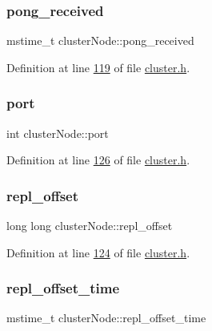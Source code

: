 \subsubsection{\texorpdfstring{pong\+\_\+received}{pong\_received}}
{\footnotesize\ttfamily mstime\+\_\+t cluster\+Node\+::pong\+\_\+received}



Definition at line \hyperlink{cluster_8h_source_l00119}{119} of file \hyperlink{cluster_8h_source}{cluster.\+h}.

\mbox{\label{structclusterNode_a8625d7d4a94bdab4579d3289850f17d1}} 
\subsubsection{\texorpdfstring{port}{port}}
{\footnotesize\ttfamily int cluster\+Node\+::port}



Definition at line \hyperlink{cluster_8h_source_l00126}{126} of file \hyperlink{cluster_8h_source}{cluster.\+h}.

\mbox{\label{structclusterNode_a71e240137314f16e9b6bd3baa2075ef8}} 
\subsubsection{\texorpdfstring{repl\+\_\+offset}{repl\_offset}}
{\footnotesize\ttfamily long long cluster\+Node\+::repl\+\_\+offset}



Definition at line \hyperlink{cluster_8h_source_l00124}{124} of file \hyperlink{cluster_8h_source}{cluster.\+h}.

\mbox{\label{structclusterNode_a025057023f653785bb08de23072553d2}} 
\subsubsection{\texorpdfstring{repl\+\_\+offset\+\_\+time}{repl\_offset\_time}}
{\footnotesize\ttfamily mstime\+\_\+t cluster\+Node\+::repl\+\_\+offset\+\_\+time}



